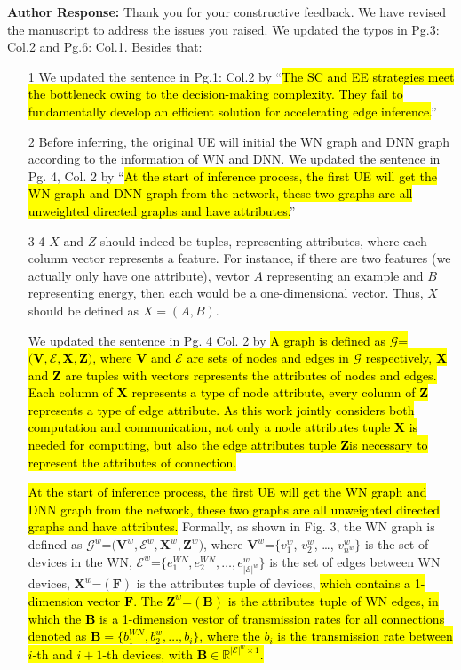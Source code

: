 \documentclass{ar2rc}
\newcommand{\highlight}[1]{\sethlcolor{yellow!50}\hl{#1}}
\begin{document}
\textbf{Author Response:} 
Thank you for your constructive feedback. We have revised the manuscript to address the issues you raised. We updated the typos in Pg.3: Col.2 and Pg.6: Col.1. Besides that:
\begin{itemize}
	\item[1] We updated the sentence in Pg.1: Col.2 by ``\hl{The SC and EE strategies meet the bottleneck owing to the decision-making complexity. They fail to fundamentally develop an efficient solution for accelerating edge inference.}''

	\item[2] Before inferring, the original UE will initial the WN graph and DNN graph according to the information of WN and DNN. We updated the sentence in Pg. 4, Col. 2 by ``\hl{At the start of inference process, the first UE will get the WN graph and DNN graph from the network, these two graphs are all unweighted directed graphs and have attributes.}''

	\item[3-4] $X$ and $Z$ should indeed be tuples, representing attributes, where each column vector represents a feature. For instance, if there are two features (we actually only have one attribute), vevtor $A$ representing an example and $B$ representing energy, then each would be a one-dimensional vector. Thus, $X$ should be defined as $X = (A, B)$. 
   
   We updated the sentence in Pg. 4 Col. 2 by \highlight{A graph is defined as $\mathcal{G}$=$\big(\mathbf{V}, \mathcal{E}, \mathbf{X}, \mathbf{Z}\big)$, where $\mathbf{V}$ and $\mathcal{E}$ are sets of nodes and edges in $\mathcal{G}$ respectively, $\mathbf{X}$ and $\mathbf{Z}$ are tuples with vectors represents the attributes of nodes and edges. Each column of $\mathbf{X}$ represents a type of node attribute, every column of $\mathbf{Z}$ represents a type of edge attribute.  As this work jointly considers both computation and communication, not only a node attributes tuple $\mathbf{X}$ is needed for computing, but also the edge attributes tuple $\mathbf{Z}$is necessary to represent the attributes of connection.}

   \highlight{At the start of inference process, the first UE will get the WN graph and DNN graph from the network, these two graphs are all unweighted directed graphs and have attributes.} Formally, as shown in Fig. 3, the WN graph is defined as $\mathcal{G}^{w}$=$\big(\mathbf{V}^{w}, \mathcal{E}^{w}, \mathbf{X}^{w}, \mathbf{Z}^{w}\big)$, where $\mathbf{V}^{w}$=$\big\{$$v_{1}^{w}$, $v_{2}^{w}$, \ldots, $v_{n^w}^{w}$$\big\}$ is the set of devices in the WN, $\mathcal{E}^{w}$=$\big\{e_{1}^{WN}, e_{2}^{WN}, \ldots, e_{|\mathcal{E}|^{w}}^{w}\big\}$ is the set of edges between WN devices, $\mathbf{X}^{w}$=$(\mathbf{F})$ is the attributes tuple of devices, \hl{which contains a 1-dimension vector $\mathbf{F}$. The $\mathbf{Z}^{w}$=$(\mathbf{B})$ is the attributes tuple of WN edges, in which the $\mathbf{B}$ is a 1-dimension vestor of transmission rates for all connections denoted as $\mathbf{B}=\{b_1^{WN}, b_2^{w}, \ldots, b_i\}$, where the $b_i$ is the transmission rate between $i$-th and $i+1$-th devices, with $\mathbf{B}$$\in$$\mathbb{R}^{|\mathcal{E}|^{w} \times 1}$.}


\end{itemize}
\end{document}
